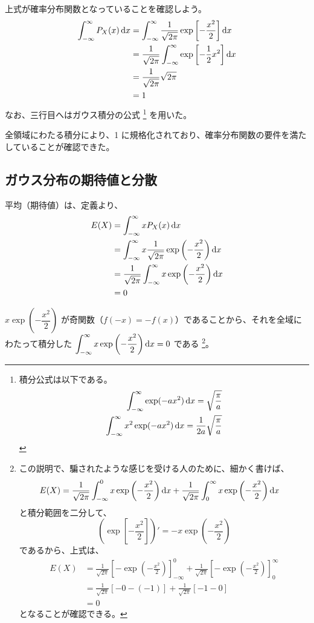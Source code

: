 \documentclass[a4paper,11pt]{ltjsarticle}
\begin{document}
\begin{appendix}
上式が確率分布関数となっていることを確認しよう。
\begin{align}
\int_{-\infty}^{\infty} P_X(x) \odif{x}
	&= \int_{-\infty}^{\infty} \frac{1}{\sqrt{2 \pi}} \exp \left[- \frac{x^2}{2} \right] \odif{x} \notag \\
	&= \frac{1}{\sqrt{2 \pi}} \int_{-\infty}^{\infty} \exp \left[- \frac{1}{2} x^2 \right] \odif{x} \notag \\
	&= \dfrac{1}{\sqrt{2 \pi}} \sqrt{2 \pi} \notag \\
	&=1
\end{align}
なお、三行目へはガウス積分の公式
\footnote{
積分公式は以下である。
\begin{eqnarray}
  \int_{-\infty}^{\infty} \exp(-a x^2) \odif{x} = \sqrt{\frac{\pi}{a}} \notag \\
  \int_{-\infty}^{\infty} x^2 \exp(- a x^2) \odif{x} = \frac{1}{2a}  \sqrt{\frac{\pi}{a}} \notag
\end{eqnarray}
}
を用いた。

全領域にわたる積分により、1 に規格化されており、確率分布関数の要件を満たしていることが確認できた。

\subsection{ガウス分布の期待値と分散}

平均（期待値）は、定義より、
\begin{align}
E(X) &= \int_{-\infty}^{\infty} x P_X(x) \odif{x} \notag \\
	&= \int_{-\infty}^{\infty} x \frac{1}{\sqrt{2 \pi}} \exp \left(- \frac{x^2}{2} \right) \odif{x} \notag \\
	&= \frac{1}{\sqrt{2 \pi}} \int_{-\infty}^{\infty} x \exp \left(- \frac{x^2}{2} \right) \odif{x} \notag \\
	&= 0
\end{align}

$x \exp \left(- \dfrac{x^2}{2} \right)$ が奇関数（$f(-x) = -f(x)$）であることから、それを全域にわたって積分した
$\displaystyle \int_{-\infty}^{\infty} x \exp \left(- \dfrac{x^2}{2} \right) \odif{x} =0$ である
\footnote{
この説明で、騙されたような感じを受ける人のために、細かく書けば、
\begin{align*}
E(X) 
	&= \frac{1}{\sqrt{2 \pi}} \int_{-\infty}^{0} x \exp \left(- \frac{x^2}{2} \right) \odif{x} 
	+ \frac{1}{\sqrt{2 \pi}} \int_{0}^{\infty} x \exp \left(- \frac{x^2}{2} \right) \odif{x}
\end{align*}
と積分範囲を二分して、
\begin{equation*}
\left(\exp \left[- \frac{x^2}{2} \right] \right)' = -x \exp \left(- \frac{x^2}{2} \right)
\end{equation*}
であるから、上式は、
\begin{align*}
E(X)
	&= \frac{1}{\sqrt{2 \pi}} \left[ - \exp \left(- \frac{x^2}{2} \right)\right]_{-\infty}^{0}
	+\frac{1}{\sqrt{2 \pi}} \left[ - \exp \left(- \frac{x^2}{2} \right)\right]_{0}^{\infty} \\
	&= \frac{1}{\sqrt{2 \pi}} [ -0 -(-1) ] + \frac{1}{\sqrt{2 \pi}} [-1 -0] \\
	&=0
\end{align*}
となることが確認できる。
}。


\end{appendix}
\end{document}
